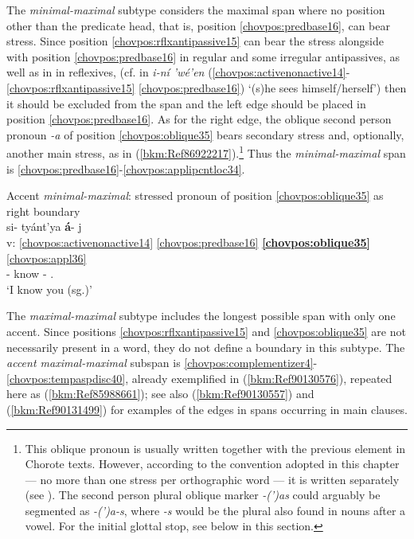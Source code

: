 \documentclass[output=paper]{langscibook}
\begin{document}
The \textit{minimal-maximal} subtype considers the maximal span where no position other than the predicate head, that is, position \ref{chovpos:predbase16}, can bear stress. Since position \ref{chovpos:rflxantipassive15} can bear the stress alongside with position \ref{chovpos:predbase16} in regular and some irregular antipassives, as well as in in reflexives, (cf. in \textit{i-ní 'wé'en} (\ref{chovpos:activenonactive14}{}-\ref{chovpos:rflxantipassive15} \ref{chovpos:predbase16}) `(s)he sees himself/herself') then it should be excluded from the span and the left edge should be placed in position \ref{chovpos:predbase16}. As for the right edge, the oblique second person pronoun \textit{-a} of position \ref{chovpos:oblique35} bears secondary stress and, optionally, another main stress, as in (\ref{bkm:Ref86922217}).\footnote{This oblique pronoun is usually written together with the previous element in Chorote texts. However, according to the convention adopted in this chapter — no more than one stress per orthographic word — it is written separately (see ). The second person plural oblique marker \textit{-(')as} could arguably be segmented as \textit{-(')a-s}, where \textit{-s} would be the plural also found in nouns after a vowel. For the initial glottal stop, see below in this section.} Thus the \textit{minimal-maximal} span is \ref{chovpos:predbase16}{}-\ref{chovpos:applipcntloc34}.

\ea\label{bkm:Ref86922217}Accent \textit{minimal-maximal}: stressed pronoun of position \ref{chovpos:oblique35} as right boundary\\
\glll {} si{}- tyánt'ya \textbf{á}{}- j\\ 
v: \ref{chovpos:activenonactive14} \ref{chovpos:predbase16} \textbf{\ref{chovpos:oblique35}} \ref{chovpos:appl36}\\
{} \First\Sg{}- know \textbf{\Second{}}- \Ap.\Ins{}\\ 
\glt `I know you (sg.)'
\z 

The \textit{maximal-maximal} subtype includes the longest possible span with only one accent. Since positions \ref{chovpos:rflxantipassive15} and \ref{chovpos:oblique35} are not necessarily present in a word, they do not define a boundary in this subtype. The \textit{accent maximal-maximal} subspan is \ref{chovpos:complementizer4}{}-\ref{chovpos:tempaspdisc40}, already exemplified in (\ref{bkm:Ref90130576}), repeated here as (\ref{bkm:Ref85988661}); see also (\ref{bkm:Ref90130557}) and (\ref{bkm:Ref90131499}) for examples of the edges in spans occurring in main clauses.
\end{document}
